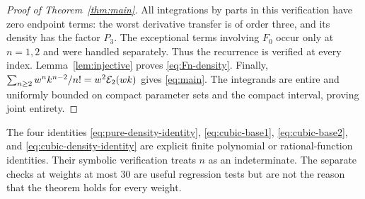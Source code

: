 \begin{proof}[Proof of Theorem~\ref{thm:main}]
All integrations by parts in this verification have zero endpoint terms:
the worst derivative transfer is of order three, and its density has the
factor $P_3$. The exceptional terms involving $F_0$ occur only at
$n=1,2$ and were handled separately. Thus the recurrence is verified at
every index. Lemma~\ref{lem:injective} proves
\eqref{eq:Fn-density}. Finally,
$\sum_{n\ge2}w^nk^{n-2}/n!=w^2\mathcal E_2(wk)$ gives
\eqref{eq:main}. The integrands are entire and uniformly bounded on
compact parameter sets and the compact interval, proving joint entirety.
\end{proof}

\begin{remark}
The four identities \eqref{eq:pure-density-identity},
\eqref{eq:cubic-base1}, \eqref{eq:cubic-base2}, and
\eqref{eq:cubic-density-identity} are explicit finite polynomial or
rational-function identities. Their symbolic verification treats $n$ as
an indeterminate. The separate checks at weights at most 30 are useful
regression tests but are not the reason that the theorem holds for every
weight.
\end{remark}
